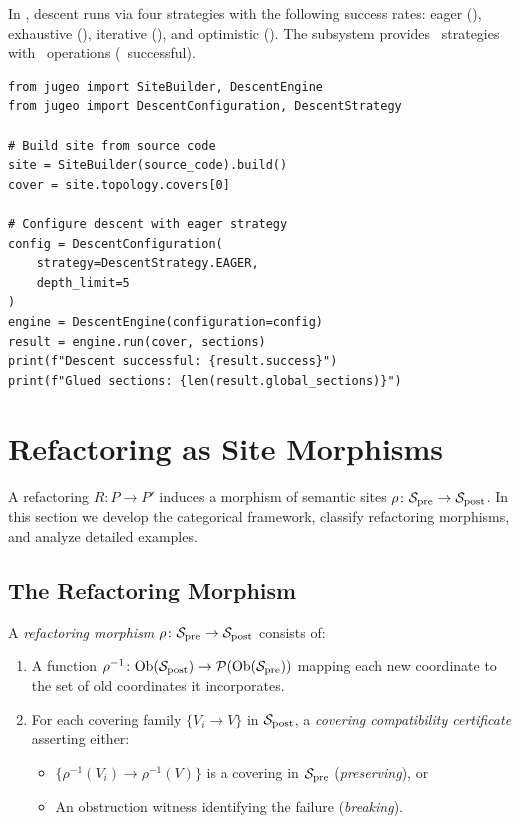 \documentclass[11pt]{article}
\newcommand{\SitePre}{\Site_{\mathrm{pre}}}
\newcommand{\SitePost}{\Site_{\mathrm{post}}}
\newcommand{\RefactorMorph}{\rho}
\begin{document}
In \JuGeo, descent runs via four strategies with the following success
rates: eager (\compDescentEagerRate), exhaustive
(\compDescentExhaustiveRate), iterative (\compDescentIterativeRate), and
optimistic (\compDescentOptimisticRate).  The subsystem provides
\subDescentStrategies\ strategies with \subDescentOps\ operations
(\subDescentOpsOk\ successful).

\begin{lstlisting}[style=jugeo-python]
from jugeo import SiteBuilder, DescentEngine
from jugeo import DescentConfiguration, DescentStrategy

# Build site from source code
site = SiteBuilder(source_code).build()
cover = site.topology.covers[0]

# Configure descent with eager strategy
config = DescentConfiguration(
    strategy=DescentStrategy.EAGER,
    depth_limit=5
)
engine = DescentEngine(configuration=config)
result = engine.run(cover, sections)
print(f"Descent successful: {result.success}")
print(f"Glued sections: {len(result.global_sections)}")
\end{lstlisting}

\section{Refactoring as Site Morphisms}\label{sec:refactoring-morphisms}

A refactoring $R \colon P \to P'$ induces a morphism of semantic sites
$\RefactorMorph \colon \SitePre \to \SitePost$.  In this section we
develop the categorical framework, classify refactoring morphisms, and
analyze detailed examples.

\subsection{The Refactoring Morphism}\label{ssec:refactor-morph-def}

\begin{definition}\label{def:refactor-morph}
A \emph{refactoring morphism} $\RefactorMorph \colon \SitePre \to
\SitePost$ consists of:
\begin{enumerate}[noitemsep]
  \item A function $\RefactorMorph^{-1} \colon \Ob(\SitePost) \to
        \mathcal{P}(\Ob(\SitePre))$ mapping each new coordinate to the
        set of old coordinates it incorporates.
  \item For each covering family $\{V_i \to V\}$ in $\SitePost$, a
        \emph{covering compatibility certificate} asserting either:
        \begin{itemize}[noitemsep]
          \item[(a)] $\{\RefactorMorph^{-1}(V_i) \to
                \RefactorMorph^{-1}(V)\}$ is a covering in $\SitePre$
                (\emph{preserving}), or
          \item[(b)] An obstruction witness identifying the failure
                (\emph{breaking}).
        \end{itemize}
\end{enumerate}
\end{definition}
\end{document}
